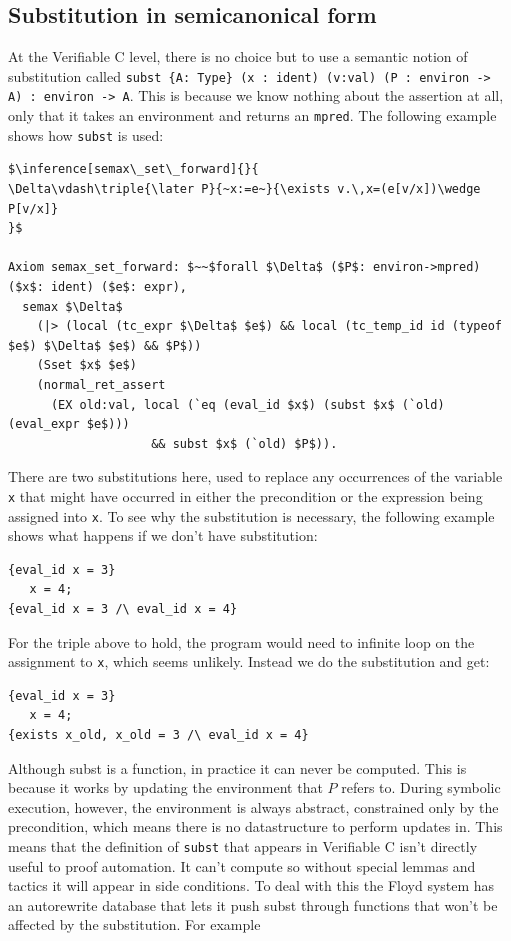 \documentclass{puthesis}
\begin{document}
\subsection{Substitution in semicanonical form}

At the Verifiable C level, there is no choice but to use a semantic
notion of substitution called \linebreak
\lstinline|subst {A: Type} (x : ident) (v:val) (P : environ -> A) : environ -> A|.
This is because we know nothing about the assertion at all, only that
it takes an environment and returns an \lstinline|mpred|. The following example
shows how \lstinline|subst| is used:

\begin{lstlisting}
$\inference[semax\_set\_forward]{}{
\Delta\vdash\triple{\later P}{~x:=e~}{\exists v.\,x=(e[v/x])\wedge P[v/x]}
}$

Axiom semax_set_forward: $~~$forall $\Delta$ ($P$: environ->mpred) ($x$: ident) ($e$: expr),
  semax $\Delta$
    (|> (local (tc_expr $\Delta$ $e$) && local (tc_temp_id id (typeof $e$) $\Delta$ $e$) && $P$))
    (Sset $x$ $e$) 
    (normal_ret_assert 
      (EX old:val, local (`eq (eval_id $x$) (subst $x$ (`old) (eval_expr $e$)))
                    && subst $x$ (`old) $P$)).
\end{lstlisting}

There are two substitutions here, used to replace any occurrences of
the variable \lstinline|x| that might have occurred in either the
precondition or the expression being assigned into \lstinline|x|. To
see why the substitution is necessary, the following example shows
what happens if we don't have substitution:

\begin{verbatim}
{eval_id x = 3}
   x = 4;
{eval_id x = 3 /\ eval_id x = 4}
\end{verbatim}

For the triple above to hold, the program would need to infinite loop
on the assignment to \lstinline|x|, which seems unlikely. Instead we
do the substitution and get:

\begin{verbatim}
{eval_id x = 3}
   x = 4;
{exists x_old, x_old = 3 /\ eval_id x = 4}
\end{verbatim}


Although subst is a function, in practice it can never be computed.
This is because it works by updating the environment that $P$ refers
to. During symbolic execution, however, the environment is always
abstract, constrained only by the precondition, which means there is
no datastructure to perform updates in. This means that the definition of
\lstinline|subst| that appears in Verifiable C isn't directly useful
to proof automation. It can't compute so without special lemmas and
tactics it will appear in side conditions. To deal with this the Floyd
system has an autorewrite database that lets it push subst through
functions that won't be affected by the substitution. For example
\end{document}
